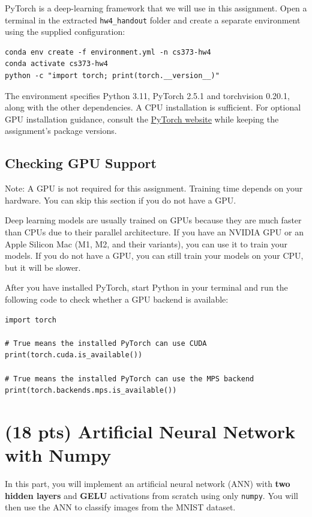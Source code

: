 \documentclass[11pt]{exam}
\begin{document}
PyTorch is a deep-learning framework that we will use in this assignment. Open a terminal in the extracted \verb|hw4_handout| folder and create a separate environment using the supplied configuration:
\begin{lstlisting}[language={}]
conda env create -f environment.yml -n cs373-hw4
conda activate cs373-hw4
python -c "import torch; print(torch.__version__)"
\end{lstlisting}
The environment specifies Python 3.11, PyTorch 2.5.1 and torchvision 0.20.1, along with the other dependencies. A CPU installation is sufficient. For optional GPU installation guidance, consult the \href{https://pytorch.org/get-started/locally/}{PyTorch website} while keeping the assignment's package versions.

\subsection*{Checking GPU Support}
Note: A GPU is not required for this assignment. Training time depends on your hardware. You can skip this section if you do not have a GPU.

Deep learning models are usually trained on GPUs because they are much faster than CPUs due to their parallel architecture. If you have an NVIDIA GPU or an Apple Silicon Mac (M1, M2, and their variants), you can use it to train your models. If you do not have a GPU, you can still train your models on your CPU, but it will be slower.

After you have installed PyTorch, start Python in your terminal and run the following code to check whether a GPU backend is available:

\lstset{language=Python}
\begin{lstlisting}
import torch

# True means the installed PyTorch can use CUDA
print(torch.cuda.is_available())

# True means the installed PyTorch can use the MPS backend
print(torch.backends.mps.is_available())
\end{lstlisting}

\section{(18 pts) Artificial Neural Network with Numpy}
In this part, you will implement an artificial neural network (ANN) with \textbf{two hidden layers} and \textbf{GELU} activations from scratch using only \verb|numpy|. You will then use the ANN to classify images from the MNIST dataset.
\end{document}
